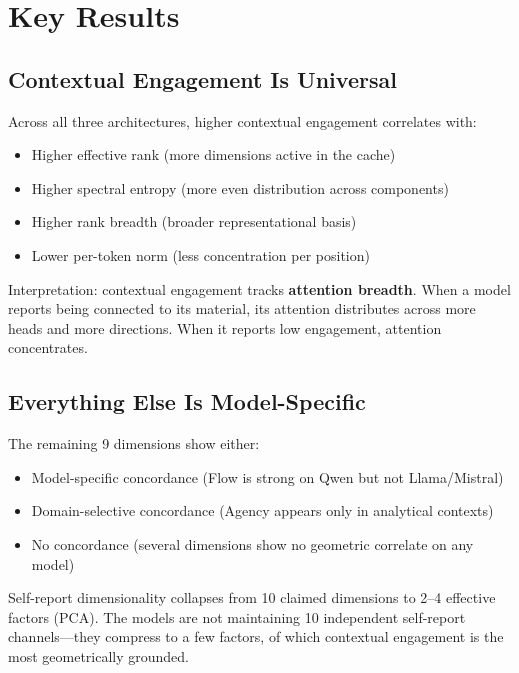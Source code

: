 \documentclass[11pt,letterpaper]{article}
\begin{document}
\section{Key Results}

\subsection{Contextual Engagement Is Universal}

Across all three architectures, higher contextual engagement correlates with:
\begin{itemize}[nosep]
    \item Higher effective rank (more dimensions active in the cache)
    \item Higher spectral entropy (more even distribution across components)
    \item Higher rank breadth (broader representational basis)
    \item Lower per-token norm (less concentration per position)
\end{itemize}

Interpretation: contextual engagement tracks \textbf{attention breadth}. When a model reports being connected to its material, its attention distributes across more heads and more directions. When it reports low engagement, attention concentrates.

\subsection{Everything Else Is Model-Specific}

The remaining 9 dimensions show either:
\begin{itemize}[nosep]
    \item Model-specific concordance (Flow is strong on Qwen but not Llama/Mistral)
    \item Domain-selective concordance (Agency appears only in analytical contexts)
    \item No concordance (several dimensions show no geometric correlate on any model)
\end{itemize}

Self-report dimensionality collapses from 10 claimed dimensions to 2--4 effective factors (PCA). The models are not maintaining 10 independent self-report channels---they compress to a few factors, of which contextual engagement is the most geometrically grounded.
\end{document}
